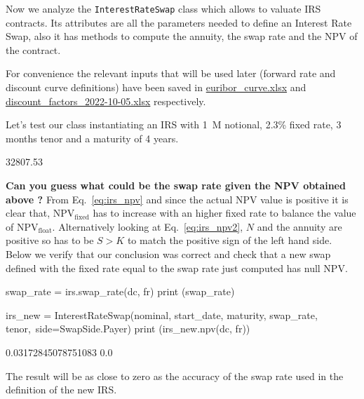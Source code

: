 \begin{finmarkets}
Now we analyze the \texttt{InterestRateSwap} class which allows to valuate IRS contracts. Its attributes are all the parameters needed to define an Interest Rate Swap, also it has methods to compute the annuity, the swap rate and the NPV of the contract. 
\end{finmarkets}


For convenience the relevant inputs that will be used later (forward rate and discount curve definitions) have been saved in \href{https://github.com/matteosan1/finance_course/raw/master/input_files/euribor_curve.xlsx}{euribor\_curve.xlsx} and \href{https://github.com/matteosan1/finance_course/raw/master/input_files/discount_factors_2022-10-05.xlsx}{discount\_factors\_2022-10-05.xlsx} respectively.

Let's test our class instantiating an IRS with 1~M notional, 2.3\% fixed rate, 3 months tenor and a maturity of 4 years.


\begin{ioutput}
32807.53
\end{ioutput}
\textbf{Can you guess what could be the \textbf{swap rate} given the NPV obtained above ?}
\noindent
From Eq.~\ref{eq:irs_npv} and since the actual NPV value is positive it is clear that, NPV$_{\textrm{fixed}}$ has to increase with an higher fixed rate to balance the value of NPV$_{\textrm{float}}$.
Alternatively looking at Eq.~\ref{eq:irs_npv2}, $N$ and the annuity are positive so has to be $S > K$ to match the positive sign of the left hand side.  
Below we verify that our conclusion was correct and check that a new swap defined with the fixed rate equal to the swap rate just computed has null NPV.

\begin{ipython}
swap_rate = irs.swap_rate(dc, fr)
print (swap_rate)

irs_new = InterestRateSwap(nominal, start_date, maturity, swap_rate, tenor,\
                           side=SwapSide.Payer)
print (irs_new.npv(dc, fr))
\end{ipython}
\begin{ioutput}
0.03172845078751083
0.0
\end{ioutput}
\noindent
The result will be as close to zero as the accuracy of the swap rate used in the definition of the new IRS.
   
